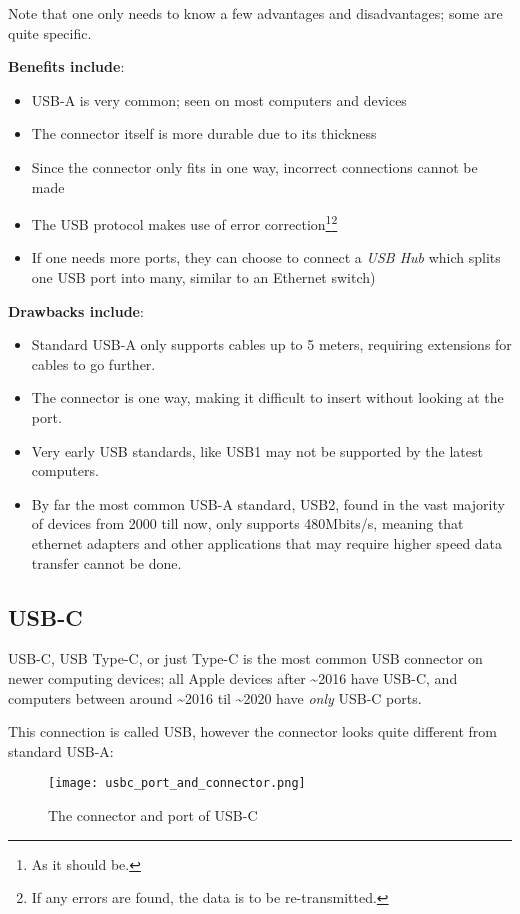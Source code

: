 \documentclass[../main.tex]{subfiles}
\begin{document}
Note that one only needs to know a few advantages and disadvantages; some are quite specific.

\textbf{Benefits include}:
\begin{itemize}
    \item USB-A is very common; seen on most computers and devices
    \item The connector itself is more durable due to its thickness
    \item Since the connector only fits in one way, incorrect connections cannot be made
    \item The USB protocol makes use of error correction\footnote{As it should be.}\footnote{If any errors are found, the data is to be re-transmitted.}
    \item If one needs more ports, they can choose to connect a \emph{USB Hub} which splits one USB port into many, similar to an Ethernet switch)
\end{itemize}

\textbf{Drawbacks include}:
\begin{itemize}
    \item Standard USB-A only supports cables up to 5 meters, requiring extensions for cables to go further.
    \item The connector is one way, making it difficult to insert without looking at the port.
    \item Very early USB standards, like USB1 may not be supported by the latest computers.
    \item By far the most common USB-A standard, USB2, found in the vast majority of devices from 2000 till now, only supports 480Mbits/s, meaning that ethernet adapters and other applications that may require higher speed data transfer cannot be done.
\end{itemize}

\subsection{USB-C}

USB-C, USB Type-C, or just Type-C is the most common USB connector on newer computing devices; all Apple devices after \textasciitilde 2016 have USB-C, and computers between around \textasciitilde 2016 til \textasciitilde 2020 have \emph{only} USB-C ports.

This connection is called USB, however the connector looks quite different from standard USB-A:

\begin{figure}[h]
    \centering
    \texttt{[image: usbc\_port\_and\_connector.png]}
    \caption{The connector and port of USB-C}
    \label{fig:usbc_port_and_connector}
\end{figure}
\end{document}
